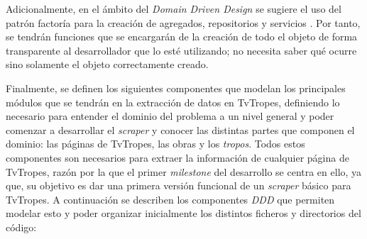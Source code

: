 Adicionalmente, en el ámbito del \textit{Domain Driven Design} se sugiere el uso
del patrón factoría para la creación de agregados, repositorios y servicios
\cite{ddd_golang}. Por tanto, se tendrán funciones que se encargarán de la
creación de todo el objeto de forma transparente al desarrollador que lo esté
utilizando; no necesita saber qué ocurre sino solamente el objeto correctamente
creado.

Finalmente, se definen los siguientes componentes que modelan los principales
módulos que se tendrán en la extracción de datos en TvTropes, definiendo lo
necesario para entender el dominio del problema a un nivel general y poder
comenzar a desarrollar el \textit{scraper} y conocer las distintas partes que
componen el dominio: las páginas de TvTropes, las obras y los \textit{tropos}.
Todos estos componentes son necesarios para extraer la información de cualquier
página de TvTropes, razón por la que el primer \textit{milestone} del desarrollo
se centra en ello, ya que, su objetivo es dar una primera versión funcional de
un \textit{scraper} básico para TvTropes. A continuación se describen los
componentes \textit{DDD} que permiten modelar esto y poder organizar
inicialmente los distintos ficheros y directorios del código: 
